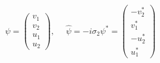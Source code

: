 \begin{equation}
\psi = \left(
\begin{array}{c}
v_{1}\\
v_{2}\\
u_{1}\\
u_{2}
\end{array}
\right),~~~~~~\hat{\psi} = -i \sigma_{2} \psi^{\ast} = \left(
\begin{array}{cc}
 -v_{2}^{\ast}\\
 v_{1}^{\ast}\\
-u_{2}^{\ast}\\
 u_{1}^{\ast}
\end{array}
\right)
\end{equation}

